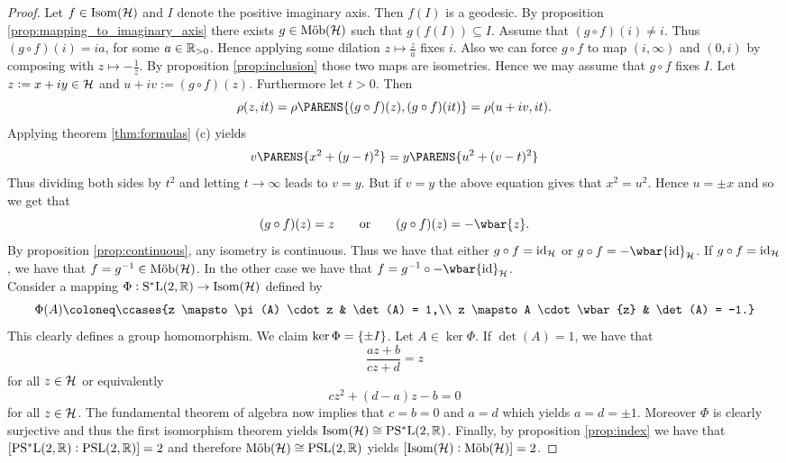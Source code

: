 \begin{proof}
	Let $f \in \mathrm{Isom}(\mathcal{H})$ and $I$ denote the positive imaginary axis. Then $f(I)$ is a geodesic. By proposition \ref{prop:mapping_to_imaginary_axis} there exists $g \in \mathrm{M\ddot{o}b}(\mathcal{H})$ such that $g(f(I)) \subseteq I$. Assume that $(g \circ f)(i) \neq i$. Thus $(g \circ f)(i) = ia$, for some $a \in \mathbb{R}_{>0}$. Hence applying some dilation $z \mapsto \frac{z}{a}$ fixes $i$. Also we can force $g \circ f$ to map $(i,\infty)$ and $(0,i)$ by composing with $z \mapsto -\frac{1}{z}$. By proposition \ref{prop:inclusion} those two maps are isometries. Hence we may assume that $g \circ f$ fixes $I$. Let $z := x + iy \in \mathcal{H}$ and $u + iv := (g \circ f )(z)$. Furthermore let $t > 0$. Then
	\begin{equation*}
		\rho(z,it) = \rho\PARENS{(g \circ f)(z),(g \circ f)(it)} = \rho(u + iv, it).
	\end{equation*}
	Applying theorem \ref{thm:formulas} (c) yields
	\begin{equation*}
		v\PARENS{x^2 + (y - t)^2} = y\PARENS{u^2 + (v - t)^2}
	\end{equation*}
	Thus dividing both sides by $t^2$ and letting $t \to \infty$ leads to $v = y$. But if $v = y$ the above equation gives that $x^2 = u^2$. Hence $u = \pm x$ and so we get that
	\begin{equation*}
		(g \circ f)(z) = z \qquad \text{or} \qquad (g \circ f)(z) = - \wbar{z}.
	\end{equation*}
	By proposition \ref{prop:continuous}, any isometry is continuous. Thus we have that either $g \circ f = \operatorname{id}_{\mathcal{H}}$ or $g \circ f = -\wbar{\id}_\Hcal$. If $g \circ f = \operatorname{id}_{\mathcal{H}}$, we have that $f = g^{-1} \in \mathrm{M\ddot{o}b}(\mathcal{H})$. In the other case we have that $f = g^{-1} \circ -\wbar{\id}_\Hcal$.\\
	Consider a mapping $\Phi : \mathrm{S^*L}(2,\mathbb{R}) \to \mathrm{Isom}(\mathcal{H})$ defined by 
	\begin{equation*}
		\Phi(A) \coloneq \ccases{z \mapsto \pi(A) \cdot z & \det(A) = 1,\\
			z \mapsto A \cdot \wbar{z} & \det(A) = -1.}
	\end{equation*}
	This clearly defines a group homomorphism. We claim $\ker \Phi = \cbr[0]{\pm I}$. Let $A \in \ker \Phi$. If $\det(A) = 1$, we have that 
	\begin{equation*}
		\frac{az + b}{cz + d} = z
	\end{equation*}
	\noindent for all $z \in \mathcal{H}$ or equivalently
	\begin{equation*}
		cz^2 + (d - a)z - b = 0
	\end{equation*}
	\noindent for all $z \in \mathcal{H}$. The fundamental theorem of algebra now implies that $c = b = 0$ and $a = d$ which yields $a = d = \pm 1$. Moreover $\Phi$ is 
	clearly surjective and thus the first isomorphism theorem \cite[23]{grillet:abstract_algebra:2007} yields $\mathrm{Isom}(\mathcal{H}) \cong \mathrm{PS^*L}(2,\mathbb{R})$. Finally, by proposition \ref{prop:index} we have that $\sbr[0]{\PSLrmstar(2,\Rbb) : \PSLrm(2,\Rbb)} = 2$ and therefore $\mathrm{M\ddot{o}b}(\mathcal{H}) \cong \mathrm{PSL}(2,\mathbb{R})$ yields $\sbr[0]{\Isom(\Hcal) : \Mob(\Hcal)} = 2$.
\end{proof}

